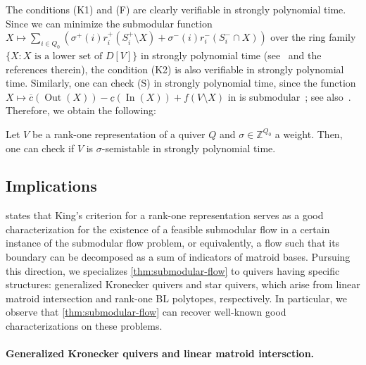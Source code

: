 \documentclass[a4paper,11pt]{article}
\numberwithin{equation}{section}
\newcommand{\Z}{\mathbb{Z}}
\DeclareMathOperator{\In}{In}
\DeclareMathOperator{\Out}{Out}
\begin{document}
The conditions (K1) and (F) are clearly verifiable in strongly polynomial time.
Since we can minimize the submodular function $X \mapsto \sum_{i \in Q_0}\left( \sigma^+(i) r_i^+(S_i^+ \setminus X) + \sigma^-(i) r_i^-(S_i^- \cap X) \right)$ over the ring family $\{ X : \text{$X$ is a lower set of $D[V]$} \}$ in strongly polynomial time (see~\cite{Jiang2021} and the references therein),
the condition (K2) is also verifiable in strongly polynomial time.
Similarly, one can check (S) in strongly polynomial time,
since the function $X \mapsto \overline{c}(\Out(X)) - \underline{c}(\In(X)) + f(V \setminus X)$ in  is submodular~\cite[Section~2.3]{Fujishige2005}; see also~\cite{Frank1984}.
Therefore, we obtain the following:
\begin{theorem}\label{thm:rank-one:poly}
    Let $V$ be a rank-one representation of a quiver $Q$ and $\sigma \in \Z^{Q_0}$ a weight.
    Then, one can check if $V$ is $\sigma$-semistable in strongly polynomial time.
\end{theorem}


\subsection{Implications}

 states that King's criterion for a rank-one representation serves as a good characterization for the existence of a feasible submodular flow in a certain instance of the submodular flow problem, or equivalently, a flow such that its boundary can be decomposed as a sum of indicators of matroid bases.
Pursuing this direction, we specializes \cref{thm:submodular-flow} to quivers having specific structures:
generalized Kronecker quivers and star quivers, which arise from linear matroid intersection and rank-one BL polytopes, respectively.
In particular, we observe that \cref{thm:submodular-flow} can recover well-known good characterizations on these problems.

\paragraph{Generalized Kronecker quivers and linear matroid intersction.}
\end{document}
